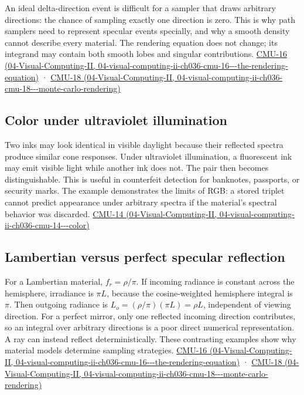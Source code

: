 An ideal delta-direction event is difficult for a sampler that draws arbitrary directions: the chance of sampling exactly one direction is zero. This is why path samplers need to represent specular events specially, and why a smooth density cannot describe every material. The rendering equation does not change; its integrand may contain both smooth lobes and singular contributions. \href{../04-Visual-Computing-II/main.pdf\#nameddest=04-visual-computing-ii-ch036-cmu-16---the-rendering-equation}{CMU-16 (04-Visual-Computing-II, 04-visual-computing-ii-ch036-cmu-16-\/-\/-the-rendering-equation)} · \href{../04-Visual-Computing-II/main.pdf\#nameddest=04-visual-computing-ii-ch036-cmu-18---monte-carlo-rendering}{CMU-18 (04-Visual-Computing-II, 04-visual-computing-ii-ch036-cmu-18-\/-\/-monte-carlo-rendering)}

\subsection{Color under ultraviolet illumination}\label{03-visual-computing-i-ch006-color-under-ultraviolet-illumination}

Two inks may look identical in visible daylight because their reflected spectra produce similar cone responses. Under ultraviolet illumination, a fluorescent ink may emit visible light while another ink does not. The pair then becomes distinguishable. This is useful in counterfeit detection for banknotes, passports, or security marks. The example demonstrates the limits of RGB: a stored triplet cannot predict appearance under arbitrary spectra if the material's spectral behavior was discarded. \href{../04-Visual-Computing-II/main.pdf\#nameddest=04-visual-computing-ii-ch036-cmu-14---color}{CMU-14 (04-Visual-Computing-II, 04-visual-computing-ii-ch036-cmu-14-\/-\/-color)}

\subsection{Lambertian versus perfect specular reflection}\label{03-visual-computing-i-ch006-lambertian-versus-perfect-specular-reflection}

For a Lambertian material, \(f_r=\rho/\pi\). If incoming radiance is constant across the hemisphere, irradiance is \(\pi L\), because the cosine-weighted hemisphere integral is \(\pi\). Then outgoing radiance is \(L_o=(\rho/\pi)(\pi L)=\rho L\), independent of viewing direction. For a perfect mirror, only one reflected incoming direction contributes, so an integral over arbitrary directions is a poor direct numerical representation. A ray can instead reflect deterministically. These contrasting examples show why material models determine sampling strategies. \href{../04-Visual-Computing-II/main.pdf\#nameddest=04-visual-computing-ii-ch036-cmu-16---the-rendering-equation}{CMU-16 (04-Visual-Computing-II, 04-visual-computing-ii-ch036-cmu-16-\/-\/-the-rendering-equation)} · \href{../04-Visual-Computing-II/main.pdf\#nameddest=04-visual-computing-ii-ch036-cmu-18---monte-carlo-rendering}{CMU-18 (04-Visual-Computing-II, 04-visual-computing-ii-ch036-cmu-18-\/-\/-monte-carlo-rendering)}

